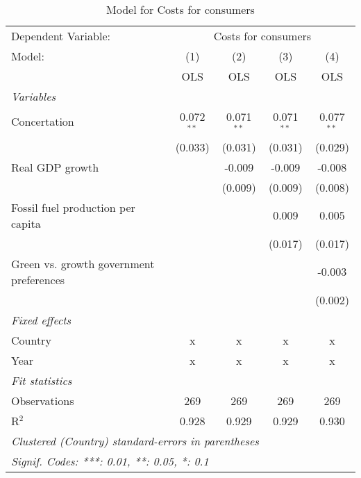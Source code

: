 
\begin{table}[htbp]
   \caption{Model for Costs for consumers}
   \centering
   \begin{tabular}{lcccc}
      \toprule
      Dependent Variable: & \multicolumn{4}{c}{Costs for consumers}\\
      Model:                                  & (1)          & (2)          & (3)          & (4)\\  
                                              &  OLS         & OLS          & OLS          & OLS\\  
      \midrule
      \emph{Variables}\\
      Concertation                            & 0.072$^{**}$ & 0.071$^{**}$ & 0.071$^{**}$ & 0.077$^{**}$\\   
                                              & (0.033)      & (0.031)      & (0.031)      & (0.029)\\   
      Real GDP growth                         &              & -0.009       & -0.009       & -0.008\\   
                                              &              & (0.009)      & (0.009)      & (0.008)\\   
      Fossil fuel production per capita       &              &              & 0.009        & 0.005\\   
                                              &              &              & (0.017)      & (0.017)\\   
      Green vs. growth government preferences &              &              &              & -0.003\\   
                                              &              &              &              & (0.002)\\   
      \emph{Fixed effects}\\
      Country                                 & x            & x            & x            & x\\  
      Year                                    & x            & x            & x            & x\\  
      \midrule \emph{Fit statistics}\\
      Observations                            & 269          & 269          & 269          & 269\\  
      R$^2$                                   & 0.928        & 0.929        & 0.929        & 0.930\\  
      \midrule
      \multicolumn{5}{l}{\emph{Clustered (Country) standard-errors in parentheses}}\\
      \multicolumn{5}{l}{\emph{Signif. Codes: ***: 0.01, **: 0.05, *: 0.1}}\\
   \end{tabular}
\end{table}


